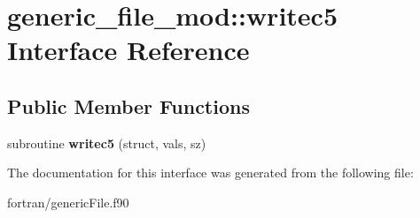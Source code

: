 \hypertarget{interfacegeneric__file__mod_1_1writec5}{}\section{generic\+\_\+file\+\_\+mod\+:\+:writec5 Interface Reference}
\label{interfacegeneric__file__mod_1_1writec5}
\subsection*{Public Member Functions}
\begin{DoxyCompactItemize}
\item 
\mbox{\label{interfacegeneric__file__mod_1_1writec5_a89883fb16d11c60cf57b18f002f34e2f}} 
subroutine {\bfseries writec5} (struct, vals, sz)
\end{DoxyCompactItemize}


The documentation for this interface was generated from the following file\+:\begin{DoxyCompactItemize}
\item 
fortran/generic\+File.\+f90\end{DoxyCompactItemize}
